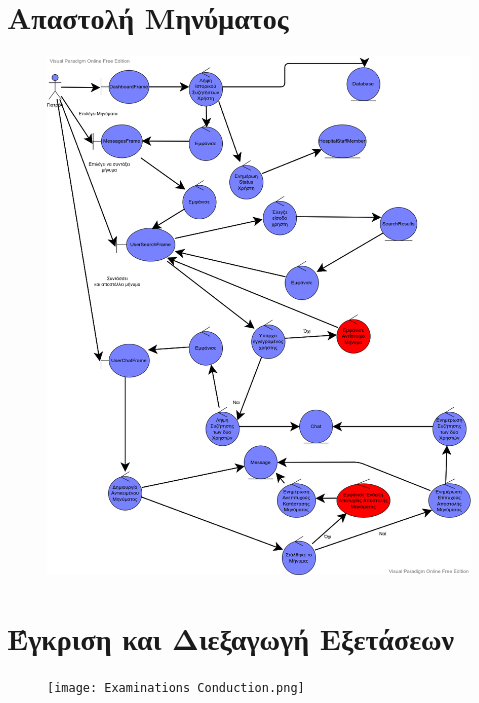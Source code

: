 \documentclass{article}
\begin{document}
\newpage

\section{Απαστολή Μηνύματος}

\vspace{0.2cm}

\begin{figure}[!htb]
        \centering
        \includegraphics[width=1\textwidth]{Messages.png}
\end{figure}

\newpage

\section{Έγκριση και Διεξαγωγή Εξετάσεων}

\vspace{0.2cm}

\begin{figure}[!htb]
        \centering
        \texttt{[image: Εxaminations Conduction.png]}
\end{figure}
\end{document}
